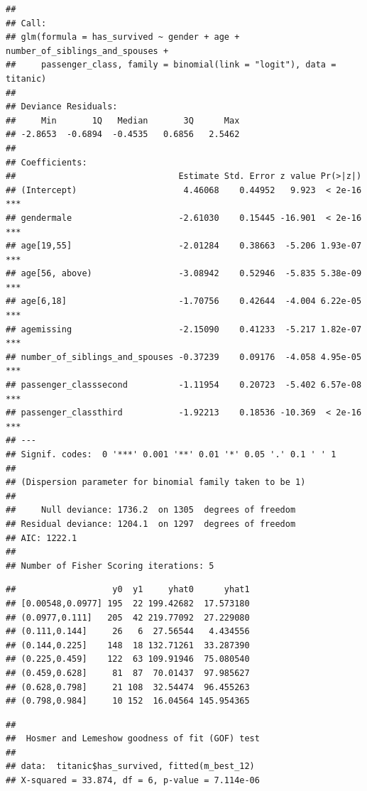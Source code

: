 \documentclass[12pt, oneside]{book}
\theoremstyle{definition}
\theoremstyle{definition}
\theoremstyle{definition}
\theoremstyle{remark}
\begin{document}
\begin{verbatim}
## 
## Call:
## glm(formula = has_survived ~ gender + age + number_of_siblings_and_spouses + 
##     passenger_class, family = binomial(link = "logit"), data = titanic)
## 
## Deviance Residuals: 
##     Min       1Q   Median       3Q      Max  
## -2.8653  -0.6894  -0.4535   0.6856   2.5462  
## 
## Coefficients:
##                                Estimate Std. Error z value Pr(>|z|)    
## (Intercept)                     4.46068    0.44952   9.923  < 2e-16 ***
## gendermale                     -2.61030    0.15445 -16.901  < 2e-16 ***
## age[19,55]                     -2.01284    0.38663  -5.206 1.93e-07 ***
## age[56, above)                 -3.08942    0.52946  -5.835 5.38e-09 ***
## age[6,18]                      -1.70756    0.42644  -4.004 6.22e-05 ***
## agemissing                     -2.15090    0.41233  -5.217 1.82e-07 ***
## number_of_siblings_and_spouses -0.37239    0.09176  -4.058 4.95e-05 ***
## passenger_classsecond          -1.11954    0.20723  -5.402 6.57e-08 ***
## passenger_classthird           -1.92213    0.18536 -10.369  < 2e-16 ***
## ---
## Signif. codes:  0 '***' 0.001 '**' 0.01 '*' 0.05 '.' 0.1 ' ' 1
## 
## (Dispersion parameter for binomial family taken to be 1)
## 
##     Null deviance: 1736.2  on 1305  degrees of freedom
## Residual deviance: 1204.1  on 1297  degrees of freedom
## AIC: 1222.1
## 
## Number of Fisher Scoring iterations: 5
\end{verbatim}

\begin{verbatim}
##                   y0  y1     yhat0      yhat1
## [0.00548,0.0977] 195  22 199.42682  17.573180
## (0.0977,0.111]   205  42 219.77092  27.229080
## (0.111,0.144]     26   6  27.56544   4.434556
## (0.144,0.225]    148  18 132.71261  33.287390
## (0.225,0.459]    122  63 109.91946  75.080540
## (0.459,0.628]     81  87  70.01437  97.985627
## (0.628,0.798]     21 108  32.54474  96.455263
## (0.798,0.984]     10 152  16.04564 145.954365
\end{verbatim}

\begin{verbatim}
## 
##  Hosmer and Lemeshow goodness of fit (GOF) test
## 
## data:  titanic$has_survived, fitted(m_best_12)
## X-squared = 33.874, df = 6, p-value = 7.114e-06
\end{verbatim}
\end{document}
